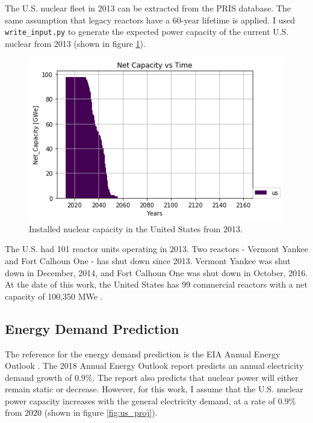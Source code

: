The U.S. nuclear fleet in 2013 can be extracted from the \gls{PRIS} database.
The same assumption that legacy reactors have a 60-year lifetime is applied.
I used \texttt{write\_input.py} to generate the expected power capacity
of the current U.S. nuclear from 2013 (shown in figure \ref{fig:us_legacy}).

\begin{figure}[htbp!]
	\begin{center}
		\includegraphics[scale=0.6]{./images/us/legacy_power.png}
	\end{center}
	\caption{Installed nuclear capacity in the United States from 2013.}
	\label{fig:us_legacy}
\end{figure}

The U.S. had 101 reactor units operating in 2013. Two reactors -
Vermont Yankee and Fort Calhoun One - has shut down since 2013.
Vermont Yankee was shut down in December, 2014, and Fort
Calhoun One was shut down in October, 2016. At the date of this
work, the United States has 99 commercial reactors with a 
net capacity of 100,350 \gls{MWe} \cite{iaea_nuclear_2017}.


\subsection{Energy Demand Prediction}
The reference for the energy demand prediction is the 
\gls{EIA} Annual Energy Outlook \cite{u.s._eia_annual_2018}.
The 2018 Annual Energy Outlook report predicts an annual electricity demand growth
of 0.9\%. The report also predicts that nuclear
power will either remain static or decrease. However, for this work,
I assume that the U.S. nuclear power capacity increases with the general electricity
demand, at a rate of 0.9\% from 2020 (shown in figure \ref{fig:us_proj}).

